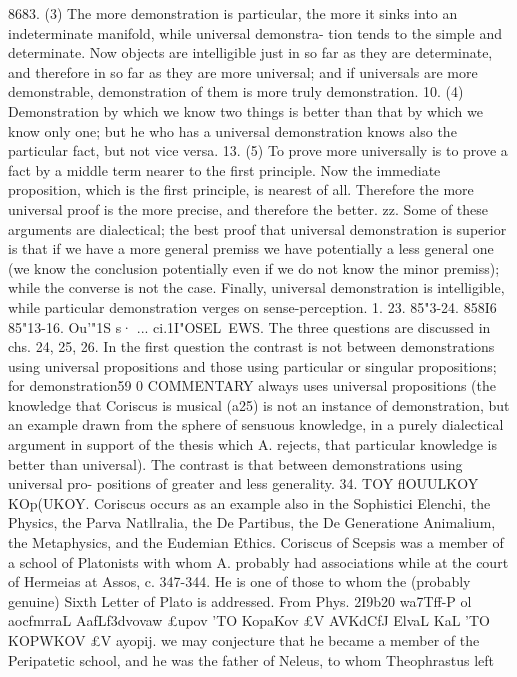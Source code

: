 {{{{{{{{{{{{{{{{{{{{{{{{{{{{{{{{8683. (3) The more demonstration is particular, the more it
sinks into an indeterminate manifold, while universal demonstra-
tion tends to the simple and determinate. Now objects are
intelligible just in so far as they are determinate, and therefore
in so far as they are more universal; and if universals are more
demonstrable, demonstration of them is more truly demonstration.
10. (4) Demonstration by which we know two things is better
than that by which we know only one; but he who has a universal
demonstration knows also the particular fact, but not vice versa.
13. (5) To prove more universally is to prove a fact by a middle
term nearer to the first principle. Now the immediate proposition,
which is the first principle, is nearest of all. Therefore the more
universal proof is the more precise, and therefore the better.
zz. Some of these arguments are dialectical; the best proof
that universal demonstration is superior is that if we have a more
general premiss we have potentially a less general one (we know
the conclusion potentially even if we do not know the minor
premiss); while the converse is not the case. Finally, universal
demonstration is intelligible, while particular demonstration
verges on sense-perception.
1. 23. 85"3-24. 858I6
85"13-16. Ou'"1S s· ... ci.1I"OSEL~EWS. The three questions are
discussed in chs. 24, 25, 26. In the first question the contrast is
not between demonstrations using universal propositions and
those using particular or singular propositions; for demonstration59 0
COMMENTARY
always uses universal propositions (the knowledge that Coriscus
is musical (a25) is not an instance of demonstration, but an
example drawn from the sphere of sensuous knowledge, in a
purely dialectical argument in support of the thesis which A.
rejects, that particular knowledge is better than universal). The
contrast is that between demonstrations using universal pro-
positions of greater and less generality.
34. TOY flOUULKOY KOp(UKOY. Coriscus occurs as an example
also in the Sophistici Elenchi, the Physics, the Parva Natllralia,
the De Partibus, the De Generatione Animalium, the Metaphysics,
and the Eudemian Ethics. Coriscus of Scepsis was a member of
a school of Platonists with whom A. probably had associations
while at the court of Hermeias at Assos, c. 347-344. He is one of
those to whom the (probably genuine) Sixth Letter of Plato is
addressed. From Phys. 2I9b20 wa7Tff-P ol aocfmrraL AafLf3dvovaw
£upov 'TO Kop{aKov £V AVKdCfJ ElvaL KaL 'TO KOPWKOV £V ayopij. we may
conjecture that he became a member of the Peripatetic school,
and he was the father of Neleus, to whom Theophrastus left
}}}}}}}}}}}}}}}}}}}}}}}}}}}}}}}}}
